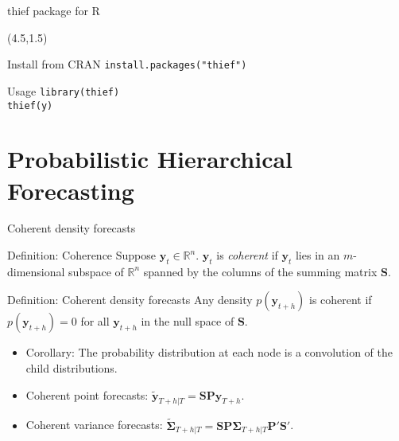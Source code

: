 \documentclass[14pt]{beamer}
\begin{document}
\begin{frame}{thief package for R}


\begin{textblock}{8}(4.5,1.5)
\end{textblock}\vspace*{3.6cm}\pause

\begin{block}{Install from CRAN}
  \texttt{install.packages("thief")}
\end{block}

\begin{alertblock}{Usage}
  \texttt{library(thief)}\\
  \texttt{thief(y)}
\end{alertblock}
\end{frame}

\section{Probabilistic Hierarchical Forecasting}

\begin{frame}{Coherent density forecasts}

\begin{block}{Definition: Coherence}
Suppose $\bm{y}_t\in\mathbb{R}^n$. $\bm{y}_t$ is \emph{coherent} if $\bm{y}_t$ lies in an $m$-dimensional subspace of $\mathbb{R}^n$ spanned by the columns of the summing matrix $\bm{S}$.
\end{block}\pause

\begin{block}{Definition: Coherent density forecasts}
Any density $p(\bm{y}_{t+h})$ is coherent if $p(\bm{y}_{t+h})=0$ for all $\bm{y}_{t+h}$ in the null space of $\bm{S}$.
\end{block}\pause

\begin{itemize}
  \item Corollary: The probability distribution at each node is a convolution of the child distributions.
  \item Coherent point forecasts: $\tilde{\bm{y}}_{T+h|T} = \bm{S}\bm{P}\hat{\bm{y}}_{T+h}$.
  \item Coherent variance forecasts:
  $\tilde{\bm{\Sigma}}_{T+h|T} = \bm{S}\bm{P}\hat{\bm{\Sigma}}_{T+h|T}\bm{P}'\bm{S}'$.
\end{itemize}

\end{frame}
\end{document}
